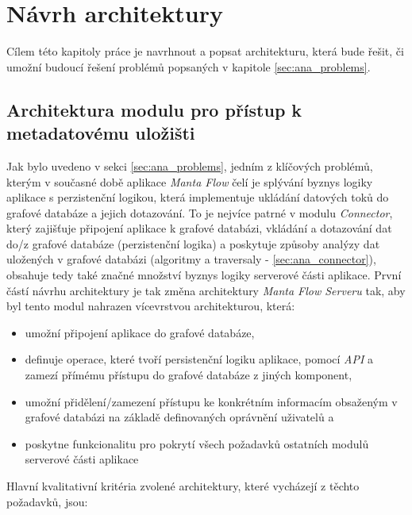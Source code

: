\chapter{Návrh architektury}
Cílem této kapitoly práce je navrhnout a popsat architekturu, která bude řešit, či umožní budoucí řešení problémů popsaných v kapitole \ref{sec:ana_problems}. %

\section{Architektura modulu pro přístup k metadatovému uložišti}
Jak bylo uvedeno v sekci \ref{sec:ana_problems}, jedním z klíčových problémů, kterým v současné době aplikace \textit{Manta Flow} čelí je splývání byznys logiky aplikace s perzistenční logikou, která implementuje ukládání datových toků do grafové databáze a jejich dotazování. To je nejvíce patrné v modulu \textit{Connector}, který zajišťuje připojení aplikace k grafové databázi, vkládání a dotazování dat do/z grafové databáze (perzistenční logika) a poskytuje způsoby analýzy dat uložených v grafové databázi (algoritmy a traversaly - \ref{sec:ana_connector}), obsahuje tedy také značné množství byznys logiky serverové části aplikace. První částí návrhu architektury je tak změna architektury \textit{Manta Flow Serveru} tak, aby byl tento modul nahrazen vícevrstvou architekturou, která:

\begin{itemize}
   \item umožní připojení aplikace do grafové databáze,
   \item definuje operace, které tvoří persistenční logiku aplikace, pomocí \textit{API} a zamezí přímému přístupu do grafové databáze z jiných komponent,
   \item umožní přidělení/zamezení přístupu ke konkrétním informacím obsaženým v grafové databázi na základě definovaných oprávnění uživatelů a
   \item poskytne funkcionalitu pro pokrytí všech požadavků ostatních modulů serverové části aplikace
\end{itemize}

Hlavní kvalitativní kritéria zvolené architektury, které vycházejí z těchto požadavků, jsou:

